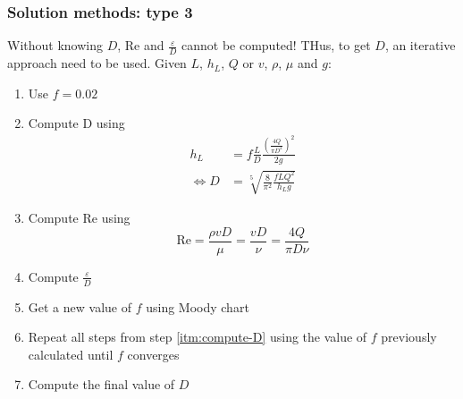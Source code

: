 \documentclass[10pt, twocolumn]{article}
\begin{document}
\subsubsection{Solution methods: type 3}
Without knowing \(D\), Re and \(\frac{\varepsilon}{D}\) cannot be computed!
THus, to get \(D\), an iterative approach need to be used.
Given \(L\), \(h_L\), \(Q\) or \(v\), \(\rho\), \(\mu\) and \(g\):
\begin{enumerate}
  \item Use \(f = 0.02\)
  \item \label{itm:compute-D} Compute D using
        \begin{align*}
          h_L    & = f \frac{L}{D} \frac{\left( \frac{4Q}{\pi D^2} \right)^2}{2g} \\
          \iff D & = \sqrt[5]{\frac{8}{\pi^2}\frac{f L Q^2}{h_L g}}
        \end{align*}
  \item Compute Re using
        \[
          \mathrm{Re} = \frac{\rho v D}{\mu} = \frac{v D}{\nu} = \frac{4 Q}{\pi D \nu}
        \]
  \item Compute \(\frac{\varepsilon}{D}\)
  \item Get a new value of \(f\) using Moody chart
  \item Repeat all steps from step \ref{itm:compute-D} using the value of \(f\) previously calculated until \(f\) converges
  \item Compute the final value of \(D\)
\end{enumerate}
\end{document}

